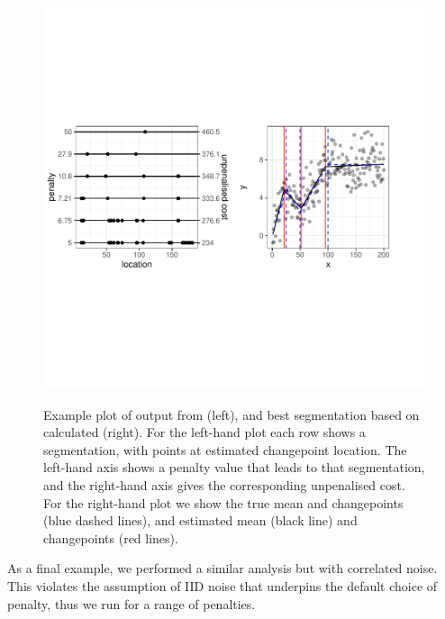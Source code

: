 \documentclass[nojss]{jss}
\begin{document}
%
%
\begin{figure}
\centering
{\includegraphics[scale=.5,width=15cm,trim={0 4.4cm 0 4.4cm},clip]{figures/cpop_crops_example_ggplot.pdf}}
\caption{Example plot of output from 
(left), and best segmentation based on calculated  (right). For the left-hand plot each row shows a segmentation, with points at estimated changepoint location. The left-hand axis shows a penalty value that leads to that segmentation, and the right-hand axis gives the corresponding unpenalised cost. For the right-hand plot we show the true mean and changepoints (blue dashed lines), and estimated mean (black line) and changepoints (red lines).}
\label{fig:crops.cpopA}
\end{figure}
%
%
As a final example, we performed a similar analysis but with correlated noise. This violates the assumption of IID noise that underpins the default choice of penalty, thus we run  for a range of penalties. 
\end{document}
